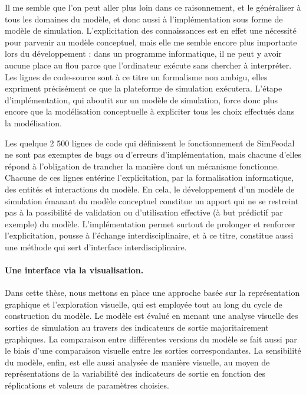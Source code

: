 Il me semble que l'on peut aller plus loin dans ce raisonnement, et le généraliser à tous les domaines du modèle, et donc aussi à l'implémentation sous forme de modèle de simulation.
L'explicitation des connaissances est en effet une nécessité pour parvenir au modèle conceptuel, mais elle me semble encore plus importante lors du développement :
	dans un programme informatique, il ne peut y avoir aucune place au flou parce que l'ordinateur exécute sans chercher à interpréter.
Les lignes de code-source sont à ce titre un formalisme non ambigu, elles expriment précisément ce que la plateforme de simulation exécutera.
L'étape d'implémentation, qui aboutit sur un modèle de simulation, force donc plus encore que la modélisation conceptuelle à expliciter tous les choix effectués dans la modélisation.

Les quelque 2 500 lignes de code qui définissent le fonctionnement de SimFeodal ne sont pas exemptes de bugs ou d'erreurs d'implémentation, mais chacune d'elles répond à l'obligation de trancher la manière dont un mécanisme fonctionne.
Chacune de ces lignes entérine l'explicitation, par la formalisation informatique, des entités et interactions du modèle.
En cela, le développement d'un modèle de simulation émanant du modèle conceptuel constitue un apport qui ne se restreint pas à la possibilité de validation ou d'utilisation effective (à but prédictif par exemple) du modèle.
L'implémentation permet surtout de prolonger et renforcer l'explicitation, pousse à l'échange interdisciplinaire, et à ce titre, constitue aussi une méthode qui sert d'interface interdisciplinaire.

\paragraph{Une interface via la visualisation.}

Dans cette thèse, nous mettons en place une approche basée sur la représentation graphique et l'exploration visuelle, qui est employée tout au long du cycle de construction du modèle.
Le modèle est évalué en menant une analyse visuelle des sorties de simulation au travers des indicateurs de sortie majoritairement graphiques.
La comparaison entre différentes versions du modèle se fait aussi par le biais d'une comparaison visuelle entre les sorties correspondantes.
La sensibilité du modèle, enfin, est elle aussi analysée de manière visuelle, au moyen de représentations de la variabilité des indicateurs de sortie en fonction des réplications et valeurs de paramètres choisies.

